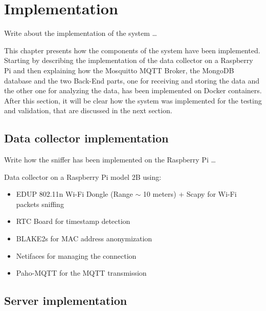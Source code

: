 \chapter{Implementation}
\label{cha:implementation}
\vspace{0.4 cm} 

Write about the implementation of the system \dots

This chapter presents how the components of the system have been implemented.
Starting by describing the implementation of the data collector on a Raspberry Pi and then explaining how the Mosquitto MQTT Broker, the MongoDB database and the two Back-End parts, one for receiving and storing the data and the other one for analyzing the data, has been implemented on Docker containers. After this section, it will be clear how the system was implemented for the testing and validation, that are discussed in the next section.


\section{Data collector implementation}
\label{sec:collector}
\vspace{0.2 cm} 

Write how the sniffer has been implemented on the Raspberry Pi \dots

Data collector on a Raspberry Pi model 2B using:
\begin{itemize}
  \item EDUP 802.11n Wi-Fi Dongle (Range $\sim$ 10 meters) + Scapy for Wi-Fi packets sniffing
  \item RTC Board for timestamp detection
  \item BLAKE2s for MAC address anonymization
  \item Netifaces for managing the connection
  \item Paho-MQTT for the MQTT transmission
\end{itemize}





\section{Server implementation}
\label{sec:server}
\vspace{0.2 cm} 

